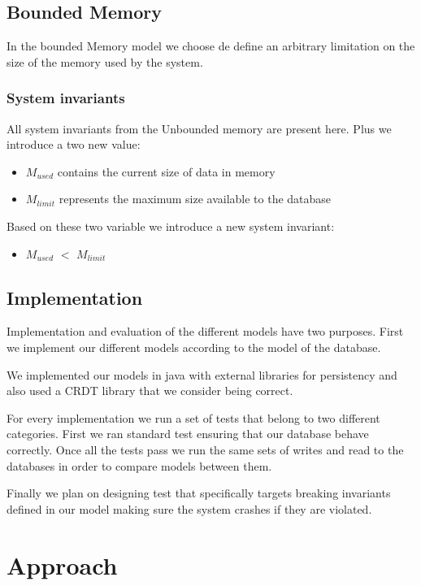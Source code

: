 \documentclass[parallelisme]{compas2022}
\begin{document}
\subsection{Bounded Memory}

In the bounded Memory model we choose de define an arbitrary limitation on the size of the memory used by the system.

\subsubsection{System invariants}
All system invariants from the Unbounded memory are present here.
Plus we introduce a two new value:
\begin{itemize}
  \item \emph{$M_{used}$} contains the current size of data in memory
  \item \emph{$M_{limit}$} represents the maximum size available to the database
\end{itemize}
Based on these two variable we introduce a new system invariant:
\begin{itemize}
  \item \emph{$M_{used}$} $<$ \emph{$M_{limit}$}
\end{itemize}



\subsection{Implementation}

Implementation and evaluation of the different models have two purposes.
First we implement our different models according to the model of the database.

We implemented our models in java with external libraries for persistency and also used a CRDT library that we consider being correct.

For every implementation we run a set of tests that belong to two different categories.
First we ran standard test ensuring that our database behave correctly.
Once all the tests pass we run the same sets of writes and read to the databases in order to compare models between them.

Finally we plan on designing test that specifically targets breaking invariants defined in our model making sure the system crashes if they are violated.



\section{Approach}
\end{document}
